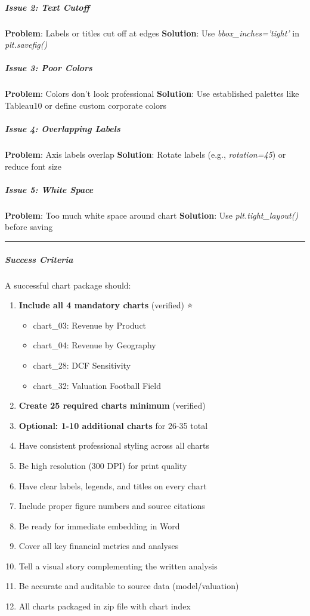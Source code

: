 \documentclass[11pt]{article}
\begin{document}
\subparagraph{Issue 2: Text Cutoff}\mbox{}\par
\textbf{Problem}: Labels or titles cut off at edges \textbf{Solution}: Use \emph{bbox\_\allowbreak{}inches='tight'} in \emph{plt.savefig()}


\subparagraph{Issue 3: Poor Colors}\mbox{}\par
\textbf{Problem}: Colors don't look professional \textbf{Solution}: Use established palettes like Tableau10 or define custom corporate colors


\subparagraph{Issue 4: Overlapping Labels}\mbox{}\par
\textbf{Problem}: Axis labels overlap \textbf{Solution}: Rotate labels (e.g., \emph{rotation=45}) or reduce font size


\subparagraph{Issue 5: White Space}\mbox{}\par
\textbf{Problem}: Too much white space around chart \textbf{Solution}: Use \emph{plt.tight\_\allowbreak{}layout()} before saving


\vspace{0.5em}\hrule\vspace{0.5em}

\subparagraph{Success Criteria}\mbox{}\par

A successful chart package should:

\begin{enumerate}[leftmargin=*,itemsep=2pt,topsep=2pt]
\item {} \textbf{Include all 4 mandatory charts} (verified) ⭐
\begin{itemize}[leftmargin=*,itemsep=2pt,topsep=2pt]
\item {} chart\_\allowbreak{}03: Revenue by Product
\item {} chart\_\allowbreak{}04: Revenue by Geography
\item {} chart\_\allowbreak{}28: DCF Sensitivity
\item {} chart\_\allowbreak{}32: Valuation Football Field
\end{itemize}
\item {} \textbf{Create 25 required charts minimum} (verified)
\item {} \textbf{Optional: 1-10 additional charts} for 26-35 total
\item {} Have consistent professional styling across all charts
\item {} Be high resolution (300 DPI) for print quality
\item {} Have clear labels, legends, and titles on every chart
\item {} Include proper figure numbers and source citations
\item {} Be ready for immediate embedding in Word
\item {} Cover all key financial metrics and analyses
\item {} Tell a visual story complementing the written analysis
\item {} Be accurate and auditable to source data (model/valuation)
\item {} All charts packaged in zip file with chart index
\end{enumerate}
\end{document}
